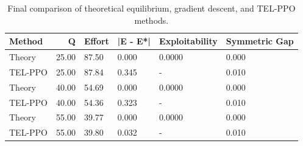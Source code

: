 \begin{table}[htbp]
\centering
\caption{Final comparison of theoretical equilibrium, gradient descent, and TEL-PPO methods.}
\label{tab:final_summary}
\begin{tabular}{lrllll}
\toprule
Method & Q & Effort & |E - E*| & Exploitability & Symmetric Gap \\
\midrule
Theory & 25.00 & 87.50 & 0.000 & 0.0000 & 0.000 \\
TEL-PPO & 25.00 & 87.84 & 0.345 & - & 0.010 \\
Theory & 40.00 & 54.69 & 0.000 & 0.0000 & 0.000 \\
TEL-PPO & 40.00 & 54.36 & 0.323 & - & 0.010 \\
Theory & 55.00 & 39.77 & 0.000 & 0.0000 & 0.000 \\
TEL-PPO & 55.00 & 39.80 & 0.032 & - & 0.010 \\
\bottomrule
\end{tabular}

\end{table}

